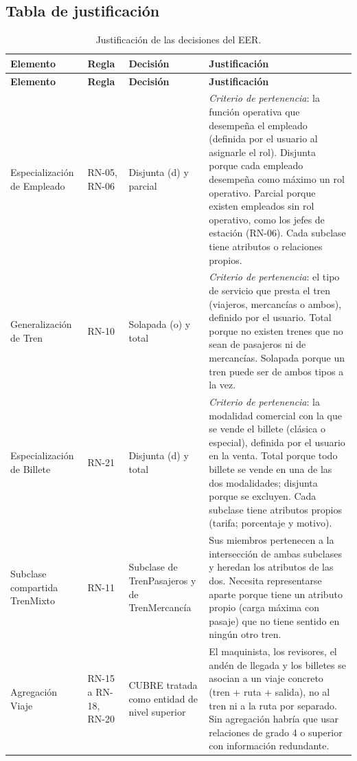 \documentclass[11pt,a4paper]{article}
\DeclareRobustCommand{\_}{\textunderscore\allowbreak}
\begin{document}
\subsection{Tabla de justificación}
\label{sec:justificacion}
{\small
\begin{longtable}{>{\raggedright\arraybackslash}p{2.9cm} >{\raggedright\arraybackslash}p{1.1cm} >{\raggedright\arraybackslash}p{3.3cm} >{\raggedright\arraybackslash}p{6.6cm}}
\caption{Justificación de las decisiones del EER.}\label{tab:justif}\\
\toprule
\textbf{Elemento} & \textbf{Regla} & \textbf{Decisión} & \textbf{Justificación} \\
\midrule
\endfirsthead
\toprule
\textbf{Elemento} & \textbf{Regla} & \textbf{Decisión} & \textbf{Justificación} \\
\midrule
\endhead
\bottomrule
\endfoot
Especialización de Empleado & RN-05, RN-06 & Disjunta (d) y parcial & \emph{Criterio de pertenencia}: la función operativa que desempeña el empleado (definida por el usuario al asignarle el rol). Disjunta porque cada empleado desempeña como máximo un rol operativo. Parcial porque existen empleados sin rol operativo, como los jefes de estación (RN-06). Cada subclase tiene atributos o relaciones propios. \\
Generalización de Tren & RN-10 & Solapada (o) y total & \emph{Criterio de pertenencia}: el tipo de servicio que presta el tren (viajeros, mercancías o ambos), definido por el usuario. Total porque no existen trenes que no sean de pasajeros ni de mercancías. Solapada porque un tren puede ser de ambos tipos a la vez. \\
Especialización de Billete & RN-21 & Disjunta (d) y total & \emph{Criterio de pertenencia}: la modalidad comercial con la que se vende el billete (clásica o especial), definida por el usuario en la venta. Total porque todo billete se vende en una de las dos modalidades; disjunta porque se excluyen. Cada subclase tiene atributos propios (tarifa; porcentaje y motivo). \\
Subclase compartida Tren\_Mixto & RN-11 & Subclase de Tren\_Pasajeros y de Tren\_Mercancía & Sus miembros pertenecen a la intersección de ambas subclases y heredan los atributos de las dos. Necesita representarse aparte porque tiene un atributo propio (carga máxima con pasaje) que no tiene sentido en ningún otro tren. \\
Agregación Viaje & RN-15 a RN-18, RN-20 & CUBRE tratada como entidad de nivel superior & El maquinista, los revisores, el andén de llegada y los billetes se asocian a un viaje concreto (tren + ruta + salida), no al tren ni a la ruta por separado. Sin agregación habría que usar relaciones de grado 4 o superior con información redundante. \\

\end{longtable}}
\end{document}
